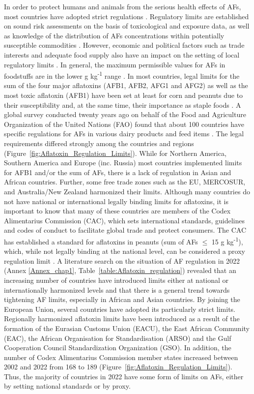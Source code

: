In order to protect humans and animals from the serious health effects of AFs, most countries have adopted strict regulations \citep{van2004worldwide}. Regulatory limits are established on sound risk assessments on the basis of toxicological and exposure data, as well as knowledge of the distribution of AFs concentrations within potentially susceptible commodities \citep{chilaka2022mycotoxin}. However, economic and political factors such as trade interests and adequate food supply also have an impact on the setting of local regulatory limits \citep{van2004worldwide}. In general, the maximum permissible values for AFs in foodstuffs are in the lower \textmu{}g kg\textsuperscript{-1} range \citep{van2004worldwide, sirma2018impacts}. In most countries, legal limits for the sum of the four major aflatoxins (AFB1, AFB2, AFG1 and AFG2) as well as the most toxic aflatoxin (AFB1) have been set at least for corn and peanuts due to their susceptibility and, at the same time, their importance as staple foods \citep{wu2013global}. A global survey conducted twenty years ago on behalf of the Food and Agriculture Organization of the United Nations (FAO) found that about 100 countries have specific regulations for AFs in various dairy products and feed items \citep{van2004worldwide}. The legal requirements differed strongly among the countries and regions (Figure~\ref{fig:Aflatoxin_Regulation_Limits}). While for Northern America, Southern America and Europe (inc. Russia) most countries implemented limits for AFB1 and/or the sum of AFs, there is a lack of regulation in Asian and African countries. Further, some free trade zones such as the EU, MERCOSUR, and Australia/New Zealand harmonized their limits. Although many countries do not have national or international legally binding limits for aflatoxins, it is important to know that many of these countries are members of the Codex Alimentarius Commission (CAC), which sets international standards, guidelines and codes of conduct to facilitate global trade and protect consumers. The CAC has established a standard for aflatoxins in peanuts (sum of AFs $\leq$ 15 \textmu{}g kg\textsuperscript{-1}), which, while not legally binding at the national level, can be considered a proxy regulation limit \citep{CAC1995}. A literature search on the situation of AF regulation in 2022 (Annex \ref{Annex_chap1}, Table~\ref{table:Aflatoxin_regulation}) revealed that an increasing number of countries have introduced limits either at national or internationally harmonized levels and that there is a general trend towards tightening AF limits, especially in African and Asian countries. By joining the European Union, several countries have adopted its particularly strict limits. Regionally harmonized aflatoxin limits have been introduced as a result of the formation of the Eurasian Customs Union (EACU), the East African Community (EAC), the African Organisation for Standardisation (ARSO) and the  Gulf Cooperation Council Standardization Organization (GSO). In addition, the number of Codex Alimentarius Commission member states increased between 2002 and 2022 from 168 to 189 (Figure~\ref{fig:Aflatoxin_Regulation_Limits}). Thus, the majority of countries in 2022 have some form of limits on AFs, either by setting national standards or by proxy. 


